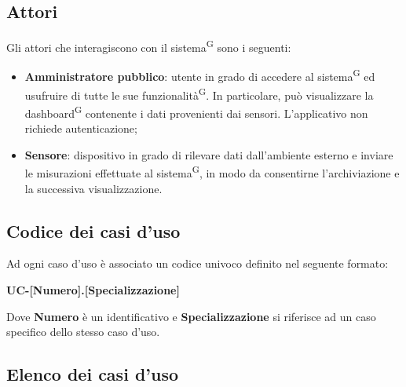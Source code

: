 \documentclass[8pt]{article}
\newcommand{\glossterm}[1]{#1\textsuperscript{G}} %
\begin{document}
\subsection{Attori}
Gli attori che interagiscono con il \glossterm{sistema} sono i seguenti:
\begin{itemize}
    \item \textbf{Amministratore pubblico}: utente in grado di accedere al \glossterm{sistema} ed usufruire di tutte le sue \glossterm{funzionalità}. In particolare, può visualizzare la \glossterm{dashboard} contenente i dati provenienti dai sensori. L'applicativo non richiede autenticazione; %
    \item \textbf{Sensore}: dispositivo in grado di rilevare dati dall'ambiente esterno e inviare le misurazioni effettuate al \glossterm{sistema}, in modo da consentirne l'archiviazione e la successiva visualizzazione.
\end{itemize}
\clearpage
\subsection{Codice dei casi d'uso}
Ad ogni caso d'uso è associato un codice univoco definito nel seguente formato:
\begin{center}
    \textbf{UC-[Numero].[Specializzazione]}
\end{center}
Dove \textbf{Numero} è un identificativo e \textbf{Specializzazione} si riferisce ad un caso specifico
dello stesso caso d'uso.
\subsection{Elenco dei casi d'uso}
\end{document}
